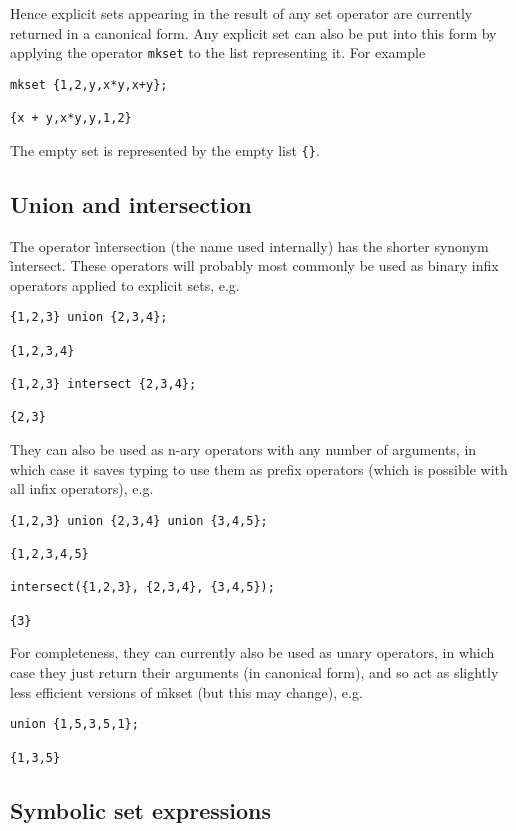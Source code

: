 Hence explicit sets appearing in the result of any set operator are
currently returned in a canonical form.  Any explicit set can also be
put into this form by applying the operator \texttt{mkset} to the list
representing it.  For example
\begin{verbatim}
mkset {1,2,y,x*y,x+y};

{x + y,x*y,y,1,2}
\end{verbatim}

The empty set is represented by the empty list \texttt{\{\}}.


\subsection{Union and intersection}
\hypertarget{operator:SETS_UNION}{}
\hypertarget{operator:INTERSECTION}{}
\hypertarget{operator:INTERSECT}{}
The operator \f{intersection} (the name used internally) has the
shorter synonym \f{intersect}.  These operators will probably most
commonly be used as binary infix operators applied to explicit sets,
e.g.
\begin{verbatim}
{1,2,3} union {2,3,4};

{1,2,3,4}

{1,2,3} intersect {2,3,4};

{2,3}
\end{verbatim}
They can also be used as n-ary operators with any number of arguments,
in which case it saves typing to use them as prefix operators (which
is possible with all \REDUCE infix operators), e.g.
\begin{verbatim}
{1,2,3} union {2,3,4} union {3,4,5};

{1,2,3,4,5}

intersect({1,2,3}, {2,3,4}, {3,4,5});

{3}
\end{verbatim}
For completeness, they can currently also be used as unary operators,
in which case they just return their arguments (in canonical form),
and so act as slightly less efficient versions of \f{mkset} (but
this may change), e.g.
\begin{verbatim}
union {1,5,3,5,1};

{1,3,5}
\end{verbatim}


\subsection{Symbolic set expressions}

